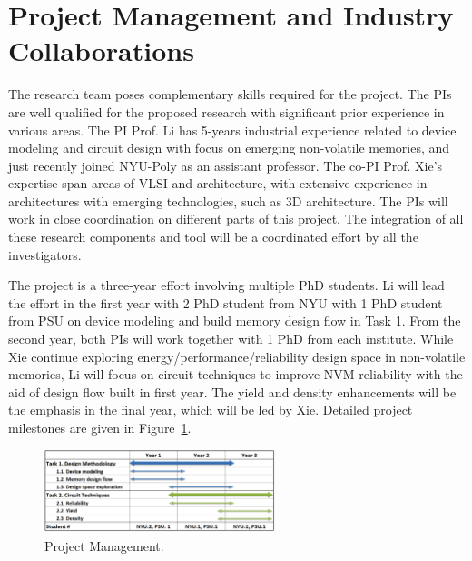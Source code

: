 
\section{Project Management and Industry Collaborations}
%

The research team poses complementary skills required for the project. The PIs are well qualified for the proposed research with significant prior experience in various areas. The PI Prof. Li has 5-years industrial experience related to device modeling and circuit design with focus on emerging non-volatile memories, and just recently joined NYU-Poly as an assistant professor. The co-PI Prof. Xie's expertise span areas of VLSI and architecture, with extensive experience in architectures with emerging technologies, such as 3D architecture. The PIs will work in close coordination on different parts of this project. The integration of all these research components and tool will be a coordinated effort by all the investigators.

The project is a three-year effort involving multiple PhD students. Li will lead the effort in the first year with 2 PhD student from NYU with 1 PhD student from PSU on device modeling and build memory design flow in Task 1. From the second year, both PIs will work together with 1 PhD from each institute. While Xie continue exploring energy/performance/reliability design space in non-volatile memories, Li will focus on circuit techniques to improve NVM reliability with the aid of design flow built in first year. The yield and density enhancements will be the emphasis in the final year, which will be led by Xie.
Detailed project milestones are given in Figure~\ref{fig:plan}.

\begin{figure}
\centering
\includegraphics[width=0.6\textwidth]{./figure/schedule.pdf}
\vspace{-10pt} \caption{Project Management.} 
\label{fig:plan} \vspace{-20pt}  
\end{figure}



